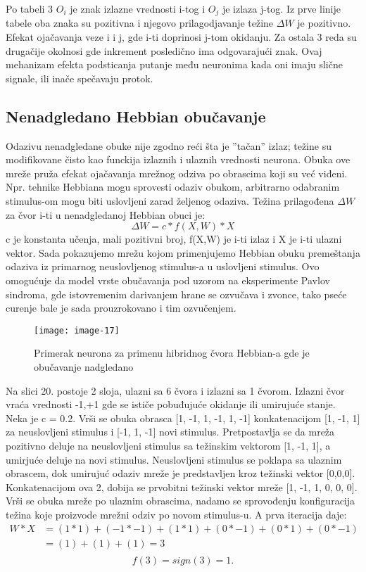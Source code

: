 \documentclass[fontsize=11bp, paper=a4]{scrarticle}
\begin{document}
Po tabeli 3 $O_i$ je znak izlazne vrednosti i-tog i $O_j$ je izlaza j-tog. Iz prve linije tabele oba znaka su pozitivna i njegovo prilagodjavanje težine $\Delta W$ je pozitivno. Efekat ojačavanja veze i i j, gde i-ti doprinosi j-tom okidanju. Za ostala 3 reda su drugačije okolnosi gde inkrement posledično ima odgovarajući znak. Ovaj mehanizam efekta podsticanja putanje među neuronima kada oni imaju slične signale, ili inače spečavaju protok. 

\subsection{Nenadgledano Hebbian obučavanje}
Odazivu nenadgledane obuke nije zgodno reći šta je ''tačan'' izlaz; težine su modifikovane čisto kao funckija izlaznih i ulaznih vrednosti neurona. Obuka ove mreže pruža efekat ojačavanja mrežnog odziva po obrascima koji su već viđeni. Npr. tehnike Hebbiana mogu sprovesti odaziv obukom, arbitrarno odabranim stimulus-om mogu biti uslovljeni zarad željenog odaziva. Težina prilagođena $\Delta W$ za čvor i-ti u nenadgledanoj Hebbian obuci je:
$$
\Delta W = c * f(X,W) * X
$$
c je konstanta učenja, mali pozitivni broj, f(X,W) je i-ti izlaz i X je i-ti ulazni vektor. Sada pokazujemo mrežu kojom primenjujemo Hebbian obuku premeštanja odaziva iz primarnog neuslovljenog stimulus-a u uslovljeni stimulus. Ovo omogućuje da model vrste obučavanja pod uzorom na eksperimente Pavlov sindroma, gde istovremenim darivanjem hrane se ozvučava i zvonce, tako pseće curenje bale je sada prouzrokovano i tim ozvučenjem.
\begin{figure}[h!]
    \centering
    \texttt{[image: image-17]}
    \caption{Primerak neurona za primenu hibridnog čvora Hebbian-a gde je obučavanje nadgledano}
\end{figure}

Na slici 20. postoje 2 sloja, ulazni sa 6 čvora i izlazni sa 1 čvorom. Izlazni čvor vraća vrednosti {-1,+1} gde se ističe pobuđujuće okidanje ili umirujuće stanje. Neka je c = 0.2. Vrši se obuka obrasca [1, -1, 1, -1, 1, -1] konkatenacijom  [1, -1, 1] za neuslovljeni stimulus i [-1, 1, -1] novi stimulus. Pretpostavlja se da mreža pozitivno deluje na neuslovljeni stimulus sa težinskim vektorom [1, -1, 1], a umirjuće deluje na novi stimulus. Neuslovljeni stimulus se poklapa sa ulaznim obrascem, dok umirujuć odaziv mreže je predstavljen kroz težinski vektor [0,0,0]. Konkatenacijom ova 2, dobija se prvobitni težinski vektor mreže [1, -1, 1, 0, 0, 0]. Vrši se obuka mreže po ulaznim obrascima, nadamo se sprovođenju konfiguracija težina koje proizvode mrežni odziv po novom stimulus-u. A prva iteracija daje:
$$
\begin{aligned}
    W*X &= (1 * 1) + (-1 * -1) + (1 * 1) + (0 * -1) + (0 * 1) + (0 * -1) \\
        &= (1) + (1) + (1) = 3 \\
\end{aligned}
$$
$$
f(3) = sign(3) = 1.
$$
\end{document}
